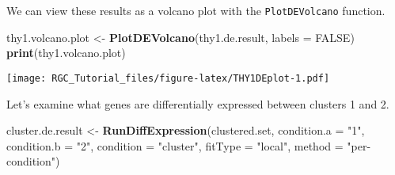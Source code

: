 \documentclass[]{article}
\newenvironment{Shaded}{\begin{snugshade}}{\end{snugshade}}
\newcommand{\DataTypeTok}[1]{\textcolor[rgb]{0.13,0.29,0.53}{#1}}
\newcommand{\DecValTok}[1]{\textcolor[rgb]{0.00,0.00,0.81}{#1}}
\newcommand{\FloatTok}[1]{\textcolor[rgb]{0.00,0.00,0.81}{#1}}
\newcommand{\KeywordTok}[1]{\textcolor[rgb]{0.13,0.29,0.53}{\textbf{#1}}}
\newcommand{\NormalTok}[1]{#1}
\newcommand{\OperatorTok}[1]{\textcolor[rgb]{0.81,0.36,0.00}{\textbf{#1}}}
\newcommand{\OtherTok}[1]{\textcolor[rgb]{0.56,0.35,0.01}{#1}}
\newcommand{\StringTok}[1]{\textcolor[rgb]{0.31,0.60,0.02}{#1}}
\begin{document}
We can view these results as a volcano plot with the
\texttt{PlotDEVolcano} function.

\begin{Shaded}
\begin{Highlighting}[]
\NormalTok{thy1.volcano.plot <-}\StringTok{ }\KeywordTok{PlotDEVolcano}\NormalTok{(thy1.de.result, }\DataTypeTok{labels =} \OtherTok{FALSE}\NormalTok{)}
\KeywordTok{print}\NormalTok{(thy1.volcano.plot)}
\end{Highlighting}
\end{Shaded}

\texttt{[image: RGC\_Tutorial\_files/figure-latex/THY1DEplot-1.pdf]}

Let's examine what genes are differentially expressed between clusters 1
and 2.

\begin{Shaded}
\begin{Highlighting}[]
\NormalTok{cluster.de.result <-}\StringTok{ }\KeywordTok{RunDiffExpression}\NormalTok{(clustered.set,}
                                       \DataTypeTok{condition.a =} \StringTok{"1"}\NormalTok{,}
                                       \DataTypeTok{condition.b =} \StringTok{"2"}\NormalTok{,}
                                       \DataTypeTok{condition =} \StringTok{"cluster"}\NormalTok{, }
                                       \DataTypeTok{fitType =} \StringTok{"local"}\NormalTok{, }
                                       \DataTypeTok{method =} \StringTok{"per-condition"}\NormalTok{)}
\end{Highlighting}
\end{Shaded}

\begin{Shaded}
\end{Shaded}
\end{document}
